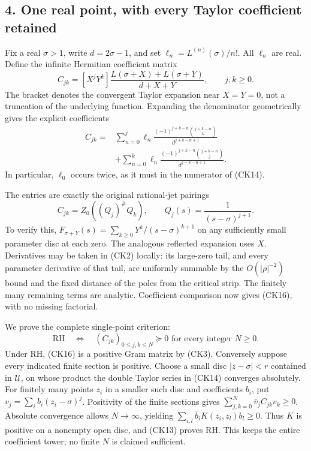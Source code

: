 \documentclass[
  10pt,
  a4paper,
]{article}
\begin{document}
\subsection{4. One real point, with every Taylor coefficient
retained}\label{one-real-point-with-every-taylor-coefficient-retained}

Fix a real \(\sigma>1\), write \(d=2\sigma-1\), and set
\(\ell_n=L^{(n)}(\sigma)/n!\). All \(\ell_n\) are real. Define the
infinite Hermitian coefficient matrix \[
C_{jk}=[X^jY^k]\frac{L(\sigma+X)+L(\sigma+Y)}{d+X+Y},\qquad j,k\ge0.
\tag{CK14}
\] The bracket denotes the convergent Taylor expansion near \(X=Y=0\),
not a truncation of the underlying function. Expanding the denominator
geometrically gives the explicit coefficients \[
\begin{aligned}
C_{jk}={}&\sum_{n=0}^j
\ell_n\frac{(-1)^{j+k-n}\binom{j+k-n}{k}}{d^{j+k-n+1}}\\
&+\sum_{n=0}^k
\ell_n\frac{(-1)^{j+k-n}\binom{j+k-n}{j}}{d^{j+k-n+1}}.
\end{aligned}\tag{CK15}
\] In particular, \(\ell_0\) occurs twice, as it must in the numerator
of (CK14).

The entries are exactly the original rational-jet pairings \[
C_{jk}=Z_0\!\left((Q_j)^\#Q_k\right),\qquad
Q_j(s)=\frac1{(s-\sigma)^{j+1}}.
\tag{CK16}
\] To verify this, \(F_{\sigma+Y}(s)=\sum_{k\ge0}Y^k/(s-\sigma)^{k+1}\)
on any sufficiently small parameter disc at each zero. The analogous
reflected expansion uses \(X\). Derivatives may be taken in (CK2)
locally: its large-zero tail, and every parameter derivative of that
tail, are uniformly summable by the \(O(|\rho|^{-2})\) bound and the
fixed distance of the poles from the critical strip. The finitely many
remaining terms are analytic. Coefficient comparison now gives (CK16),
with no missing factorial.

We prove the complete single-point criterion: \[
\boxed{\mathrm{RH}\quad\Longleftrightarrow\quad
(C_{jk})_{0\le j,k\le N}\succeq0\text{ for every integer }N\ge0.}
\tag{CK17}
\] Under RH, (CK16) is a positive Gram matrix by (CK3). Conversely
suppose every indicated finite section is positive. Choose a small disc
\(|z-\sigma|<r\) contained in \(\mathcal U\), on whose product the
double Taylor series in (CK14) converges absolutely. For finitely many
points \(z_i\) in a smaller such disc and coefficients \(b_i\), put
\(v_j=\sum_i b_i(z_i-\sigma)^j\). Positivity of the finite sections
gives \(\sum_{j,k=0}^N\bar v_jC_{jk}v_k\ge0\). Absolute convergence
allows \(N\to\infty\), yielding \(\sum_{i,l}\bar b_iK(z_i,z_l)b_l\ge0\).
Thus \(K\) is positive on a nonempty open disc, and (CK13) proves RH.
This keeps the entire coefficient tower; no finite \(N\) is claimed
sufficient.
\end{document}
